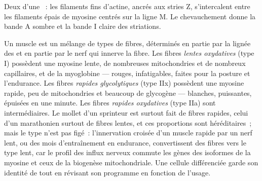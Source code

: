 \begin{omfigure}

{\small Deux  d'une ~: les filaments fins d'actine,
ancrés aux stries Z, s'intercalent entre les filaments épais de myosine
centrés sur la ligne M. Le chevauchement donne la bande A sombre et la
bande I claire des striations.}
\end{omfigure}

\begin{proposition}\label{prop:b2:cell-differentiation:types}
Un muscle est un mélange de types de fibres, déterminés en partie par la
lignée des  et en partie par le nerf qui innerve la fibre. Les
fibres \emph{lentes oxydatives} (type I) possèdent une myosine lente, de
nombreuses mitochondries et de nombreux capillaires, et de la myoglobine
--- rouges, infatigables, faites pour la posture et l'endurance. Les
fibres \emph{rapides glycolytiques} (type IIx) possèdent une myosine
rapide, peu de mitochondries et beaucoup de glycogène --- blanches,
puissantes, épuisées en une minute. Les fibres \emph{rapides oxydatives}
(type IIa) sont intermédiaires. Le mollet d'un sprinteur est surtout
fait de fibres rapides, celui d'un marathonien surtout de fibres lentes,
et ces proportions sont héréditaires~; mais le type n'est pas figé~:
l'innervation croisée d'un muscle rapide par un nerf lent, ou des mois
d'entraînement en endurance, convertissent des fibres vers le type lent,
car le profil des influx nerveux commute les gènes des isoformes de la
myosine et ceux de la biogenèse mitochondriale. Une cellule différenciée
garde son identité de  tout en révisant son programme
en fonction de l'usage.
\end{proposition}


